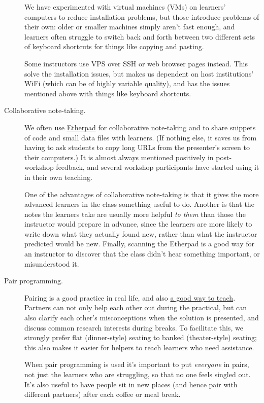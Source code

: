 \begin{description}
We have experimented with virtual machines (VMs) on learners'
computers to reduce installation problems, but those introduce
problems of their own: older or smaller machines simply aren't fast
enough, and learners often struggle to switch back and forth between
two different sets of keyboard shortcuts for things like copying and
pasting.

Some instructors use VPS over SSH or web browser pages instead.  This
solve the installation issues, but makes us dependent on host
institutions' WiFi (which can be of highly variable quality), and
has the issues mentioned above with things like keyboard shortcuts.



\item[Collaborative note-taking.] We often use \href{http://etherpad.org}{Etherpad} for collaborative
note-taking and to share snippets of code and small data files with
learners. (If nothing else, it saves us from having to ask students to
copy long URLs from the presenter's screen to their computers.) It is
almost always mentioned positively in post-workshop feedback, and
several workshop participants have started using it in their own
teaching.


One of the advantages of collaborative note-taking is that
it gives the more advanced learners in the class something useful to do.
Another is that the notes the learners take are usually more helpful \emph{to them}
than those the instructor would prepare in advance,
since the learners are more likely to write down what they actually found new,
rather than what the instructor predicted would be new.
Finally,
scanning the Etherpad is a good way for an instructor to discover that
the class didn't hear something important,
or misunderstood it.



\item[Pair programming.] Pairing is a good practice in real life, and also
\href{\{\{ page.root \}\}/files/papers/porter-what-works-2013.pdf}{a good way to teach}.
Partners can not only help each other out during the practical,
but can also clarify each other's misconceptions when the solution is
presented, and discuss common research interests during breaks. To
facilitate this, we strongly prefer flat (dinner-style) seating to
banked (theater-style) seating; this also makes it easier for helpers
to reach learners who need assistance.


When pair programming is used it's important to put \emph{everyone} in pairs,
not just the learners who are struggling,
so that no one feels singled out.
It's also useful to have people sit in new places (and hence pair with different partners)
after each coffee or meal break.




\end{description}
